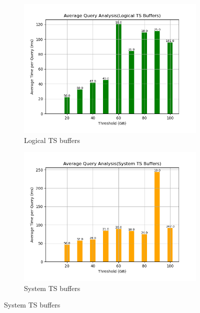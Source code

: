 \begin{figure}
	\centering
	\begin{subfigure}[c]{0.45\textwidth}
		\includegraphics[width=1\textwidth]   {figures/Experiments/Dynamic/Progress/2/average_query_time_per_batch_version_999777015_10485760_10_delay[2].png}
		\caption{Logical TS buffers}
		\label{fig:progress-queries-2-logical}
	\end{subfigure}
	\begin{subfigure}[c]{0.45\textwidth}
		\includegraphics[width=1\textwidth]   {figures/Experiments/Dynamic/Progress/2/average_query_time_per_batch_version_999777018_10485760_10_delay[2].png}
		\caption{System TS buffers}
		\label{fig:progress-queries-2-system}

\end{subfigure}
\end{figure}
